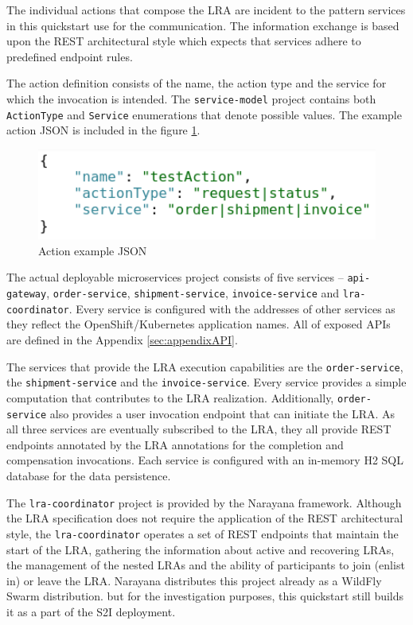 \documentclass[oneside,
  digital, %
  table,   %
  nolof,     %
  nolot,     %
]{fithesis3}
\begin{document}
The individual actions that compose the LRA are incident to the pattern services in this quickstart use for the communication. The information exchange is based upon the REST architectural style which expects that services adhere to predefined endpoint rules. 

The action definition consists of the name, the action type and the service for which the invocation is intended. The \texttt{service-model} project contains both \texttt{ActionType} and \texttt{Service} enumerations that denote possible values. The example action JSON is included in the figure \ref{fig:action-json}.

\begin{figure}[h]
    \begin{center}
        \includegraphics[height=30mm]{images/actionJSON.png}
    \end{center}
    \caption{Action example JSON}
    \label{fig:action-json}
\end{figure}

The actual deployable microservices project consists of five services -- \texttt{api-gateway}, \texttt{order-service}, \texttt{shipment-service}, \texttt{invoice-service} and \texttt{lra-coordinator}. Every service is configured with the addresses of other services as they reflect the OpenShift/Kubernetes application names. All of exposed APIs are defined in the Appendix \ref{sec:appendixAPI}.

The services that provide the LRA execution capabilities are the \texttt{order-service}, the \texttt{shipment-service} and the \texttt{invoice-service}. Every service provides a simple computation that contributes to the LRA realization. Additionally, \texttt{order-service} also provides a user invocation endpoint that can initiate the LRA. As all three services are eventually subscribed to the LRA, they all provide REST endpoints annotated by the LRA annotations for the completion and compensation invocations. Each service is configured with an in-memory H2 SQL database for the data persistence.

The \texttt{lra-coordinator} project is provided by the Narayana framework. Although the LRA specification does not require the application of the REST architectural style, the \texttt{lra-coordinator} operates a set of REST endpoints that maintain the start of the LRA, gathering the information about active and recovering LRAs, the management of the nested LRAs and the ability of participants to join (enlist in) or leave the LRA. Narayana distributes this project already as a WildFly Swarm distribution. but for the investigation purposes, this quickstart still builds it as a part of the S2I deployment.
\end{document}

